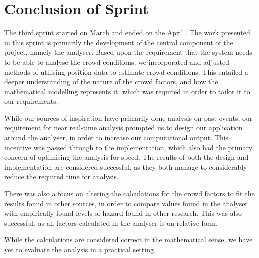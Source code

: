 \section{Conclusion of Sprint}
The third sprint started on March  and ended on the April . The work presented in this sprint is primarily the development of the central component of the project, namely the analyser. Based upon the requirement that the system needs to be able to analyse the crowd conditions, we incorporated and adjusted methods of utilising position data to estimate crowd conditions. This entailed a deeper understanding of the nature of the crowd factors, and how the mathematical modelling represents it, which was required in order to tailor it to our requirements.

While our sources of inspiration have primarily done analysis on past events, our requirement for near real-time analysis prompted us to design our application around the analyser, in order to increase our computational output. This incentive was passed through to the implementation, which also had the primary concern of optimising the analysis for speed. The results of both the design and implementation are considered successful, as they both manage to considerably reduce the required time for analysis.

There was also a focus on altering the calculations for the crowd factors to fit the results found in other sources, in order to compare values found in the analyser with empirically found levels of hazard found in other research. This was also successful, as all factors calculated in the analyser is on relative form.

While the calculations are considered correct in the mathematical sense, we have yet to evaluate the analysis in a practical setting.